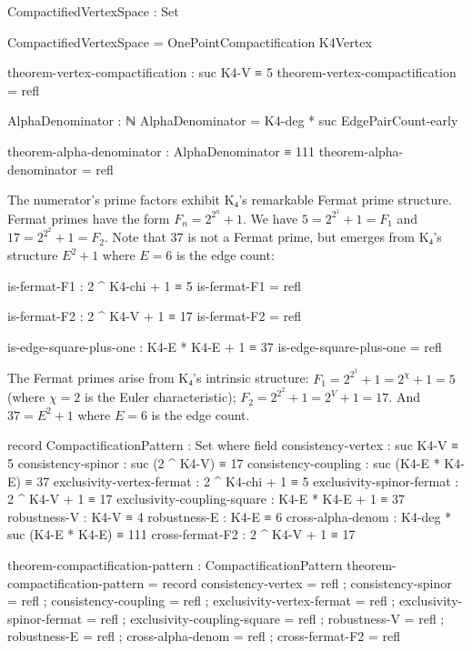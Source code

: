\documentclass[11pt,a4paper]{book}
\begin{document}
\begin{code}
CompactifiedVertexSpace : Set

CompactifiedVertexSpace = OnePointCompactification K4Vertex

theorem-vertex-compactification : suc K4-V ≡ 5
theorem-vertex-compactification = refl
\end{code}

\begin{code}
AlphaDenominator : ℕ
AlphaDenominator = K4-deg * suc EdgePairCount-early

theorem-alpha-denominator : AlphaDenominator ≡ 111
theorem-alpha-denominator = refl
\end{code}

The numerator's prime factors exhibit K₄'s remarkable Fermat prime structure. Fermat primes have the form $F_n = 2^{2^n} + 1$. We have $5 = 2^{2^1} + 1 = F_1$ and 
$17 = 2^{2^2} + 1 = F_2$. Note that 37 is not a Fermat prime, but emerges from 
K₄'s structure $E^2 + 1$ where $E = 6$ is the edge count:

\begin{code}
is-fermat-F1 : 2 ^ K4-chi + 1 ≡ 5
is-fermat-F1 = refl

is-fermat-F2 : 2 ^ K4-V + 1 ≡ 17
is-fermat-F2 = refl

is-edge-square-plus-one : K4-E * K4-E + 1 ≡ 37
is-edge-square-plus-one = refl
\end{code}

The Fermat primes arise from K₄'s intrinsic structure: $F_1 = 2^{2^1} + 1 = 2^\chi + 1 = 5$ (where $\chi = 2$ is the Euler characteristic); $F_2 = 2^{2^2} + 1 = 2^V + 1 = 17$. And $37 = E^2 + 1$ where $E = 6$ is the edge count.

\begin{code}
record CompactificationPattern : Set where
  field
    consistency-vertex : suc K4-V ≡ 5
    consistency-spinor : suc (2 ^ K4-V) ≡ 17
    consistency-coupling : suc (K4-E * K4-E) ≡ 37
    exclusivity-vertex-fermat : 2 ^ K4-chi + 1 ≡ 5
    exclusivity-spinor-fermat : 2 ^ K4-V + 1 ≡ 17
    exclusivity-coupling-square : K4-E * K4-E + 1 ≡ 37
    robustness-V : K4-V ≡ 4
    robustness-E : K4-E ≡ 6
    cross-alpha-denom : K4-deg * suc (K4-E * K4-E) ≡ 111
    cross-fermat-F2 : 2 ^ K4-V + 1 ≡ 17

theorem-compactification-pattern : CompactificationPattern
theorem-compactification-pattern = record
  { consistency-vertex = refl
  ; consistency-spinor = refl
  ; consistency-coupling = refl
  ; exclusivity-vertex-fermat = refl
  ; exclusivity-spinor-fermat = refl
  ; exclusivity-coupling-square = refl
  ; robustness-V = refl
  ; robustness-E = refl
  ; cross-alpha-denom = refl
  ; cross-fermat-F2 = refl
  }

\end{code}
\end{document}
